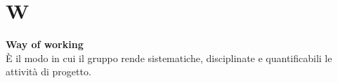 \section{W}
\textbf{Way of working}\\
È il modo in cui il gruppo rende sistematiche, disciplinate e quantificabili le attività di progetto. \\ \\

\clearpage